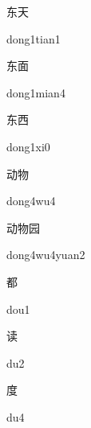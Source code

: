 \begin{verbete}{东天}
\begin{pronuncia}{dong1tian1}
\end{pronuncia}
\end{verbete}

\begin{verbete}{东面}
\begin{pronuncia}{dong1mian4}
\end{pronuncia}
\end{verbete}

\begin{verbete}[dong1xi0]{东西}
\begin{pronuncia}{dong1xi0}
\end{pronuncia}
\end{verbete}

\begin{verbete}[dong4wu4]{动物}
\begin{pronuncia}{dong4wu4}
\end{pronuncia}
\end{verbete}

\begin{verbete}{动物园}
\begin{pronuncia}{dong4wu4yuan2}
\end{pronuncia}
\end{verbete}

\begin{verbete}[dou1]{都}
\begin{pronuncia}{dou1}
\end{pronuncia}
\end{verbete}

\begin{verbete}[du2]{读}
\begin{pronuncia}{du2}
\end{pronuncia}
\end{verbete}

\begin{verbete}[du4]{度}
\begin{pronuncia}{du4}
\end{pronuncia}
\end{verbete}


